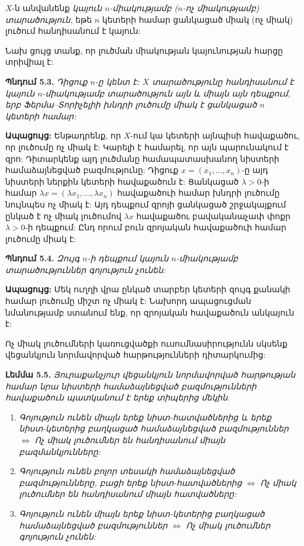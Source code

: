 \documentclass[12pt,a4paper]{article}
\numberwithin{equation}{section}
\numberwithin{figure}{section}
\begin{document}
$X$-ն անվանենք \textit{կայուն $n$-միակությամբ ($n$-ոչ միակությամբ) տարածություն}, եթե $n$ կետերի համար ցանկացած միակ (ոչ միակ) լուծում հանդիսանում է կայուն:

Նախ ցույց տանք, որ լուծման միակության կայունության հարցը տրիվիալ է:

\textbf{Պնդում 5.3.} \textit{Դիցուք $n$-ը կենտ է: $X$ տարածությունը հանդիսանում է կայուն $n$-միակությամբ տարածություն այն և միայն այն դեպքում, երբ Ֆերմա--Տորիչելիի խնդրի լուծումը միակ է ցանկացած $n$ կետերի համար:}

\textbf{Ապացույց:} Ենթադրենք, որ $X$-ում կա կետերի այնպիսի հավաքածու, որ լուծումը ոչ միակ է: Կարելի է համարել, որ այն պարունակում է զրո: Դիտարկենք այդ լուծմանը համապատասխանող նիստերի համաձայնեցված բազմությունը: Դիցուք $x = (x_1, \dots, x_n)$-ը այդ նիստերի ներքին կետերի հավաքածուն է: Ցանկացած $\lambda > 0$-ի համար $\lambda x = (\lambda x_1, \dots, \lambda x_n)$ հավաքածուի համար խնդրի լուծումը նույնպես ոչ միակ է: Այդ դեպքում զրոյի ցանկացած շրջակայքում ընկած է ոչ միակ լուծումով $\lambda x$ հավաքածու բավականաչափ փոքր $\lambda > 0$-ի դեպքում: Ընդ որում բուն զրոյական հավաքածուի համար լուծումը միակ է: 

\textbf{Պնդում 5.4.} \textit{Զույգ $n$-ի դեպքում կայուն $n$-միակությամբ տարածություններ գոյություն չունեն:}

\textbf{Ապացույց:} Մեկ ուղղի վրա ընկած տարբեր կետերի զույգ քանակի համար լուծումը միշտ ոչ միակ է: Նախորդ ապացուցման նմանությամբ ստանում ենք, որ զրոյական հավաքածուն անկայուն է: 

Ոչ միակ լուծումների կառուցվածքի ուսումնասիրությունն սկսենք վեցանկյուն նորմավորված հարթությունների դիտարկումից:

\textbf{Լեմմա 5.5.} \textit{Յուրաքանչյուր վեցանկյուն նորմավորված հարթության համար նրա նիստերի համաձայնեցված բազմությունների հավաքածուն պատկանում է երեք տիպերից մեկին.}
\begin{enumerate}
    \item \textit{Գոյություն ունեն միայն երեք նիստ-հատվածներից և երեք նիստ-կետերից բաղկացած համաձայնեցված բազմություններ $\iff$ Ոչ միակ լուծումներ են հանդիսանում միայն բազմանկյունները:}
    \item \textit{Գոյություն ունեն բոլոր տեսակի համաձայնեցված բազմությունները, բացի երեք նիստ-հատվածներից $\iff$ Ոչ միակ լուծումներ են հանդիսանում միայն հատվածները:}
    \item \textit{Գոյություն ունեն միայն երեք նիստ-կետերից բաղկացած համաձայնեցված բազմություններ $\iff$ Ոչ միակ լուծումներ գոյություն չունեն:}
\end{enumerate}
\end{document}
